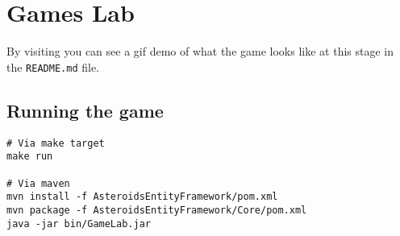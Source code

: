 \section{Games Lab}
By visiting  you can see a gif demo of what
the game looks like at this stage in the \texttt{README.md} file.

\subsection{Running the game}
\begin{verbatim}
# Via make target
make run

# Via maven
mvn install -f AsteroidsEntityFramework/pom.xml
mvn package -f AsteroidsEntityFramework/Core/pom.xml
java -jar bin/GameLab.jar
\end{verbatim}
